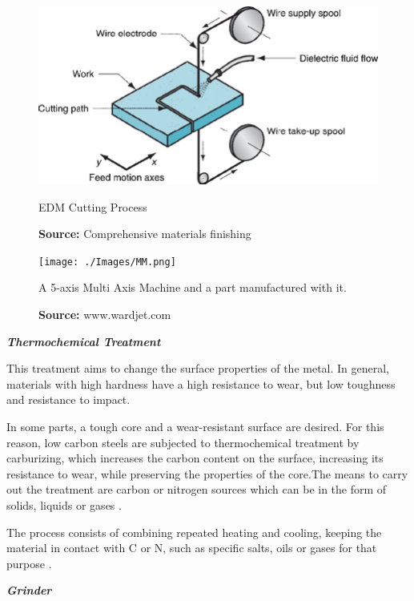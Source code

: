 \begin{figure}[h]
  \centering
  \begin{minipage}[b]{0.45\textwidth}
    \includegraphics[width=\textwidth]{./Images/EDM.png}
    \caption{EDM Cutting Process}
    \label{EDM}
    \caption*{\textbf{Source:} Comprehensive materials finishing \cite{saleh20171} }
  \end{minipage}
  \hfill
  \begin{minipage}[b]{0.3\textwidth}
    \texttt{[image: ./Images/MM.png]}
    \caption{A 5-axis Multi Axis Machine and a part manufactured with it.}
    \label{MM}
    \caption*{\textbf{Source:} www.wardjet.com}
  \end{minipage}
\end{figure}

\vspace{10}
\textbf{\emph{Thermochemical Treatment}}\par
\vspace{10}
This treatment aims to change the surface properties of the metal. In general, materials with high hardness have a high resistance to wear, but low toughness and resistance to impact.\par
In some parts, a tough core and a wear-resistant surface are desired. For this reason, low carbon steels are subjected to thermochemical treatment by carburizing, which increases the carbon content on the surface, increasing its resistance to wear, while preserving the properties of the core.The means to carry out the treatment are carbon or nitrogen sources which can be in the form of solids, liquids or gases \cite{czerwinski2012thermochemical}.\par
The process consists of combining repeated heating and cooling, keeping the material in contact with C or N, such as specific salts, oils or gases for that purpose \cite{czerwinski2012thermochemical}.\par
\vspace{5}
\textbf{\emph{Grinder}}
\vspace{5}

